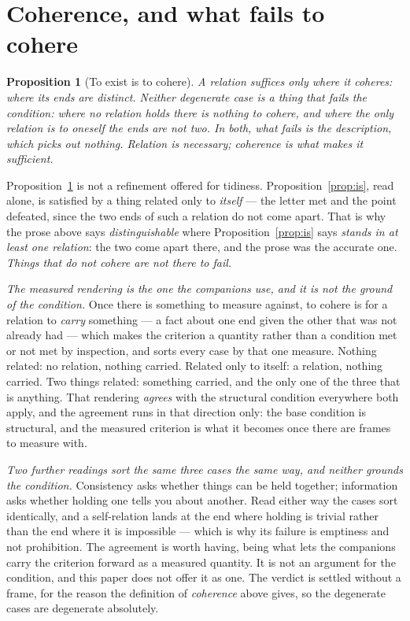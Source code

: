 \documentclass[11pt,a4paper]{article}
\newtheorem{proposition}{Proposition}
\theoremstyle{remark}\newtheorem{remark}[proposition]{Remark}
\begin{document}
\section{Coherence, and what fails to cohere}\label{sec:cohere}
\begin{proposition}[To exist is to cohere]\label{prop:cohere}
A relation suffices only where it \emph{coheres}: where its ends are distinct. Neither degenerate case
is a thing that fails the condition: where no relation holds there is nothing to cohere, and where the
only relation is to oneself the ends are not two. In both, what fails is the \emph{description}, which
picks out nothing. Relation is necessary; coherence is what makes it sufficient.
\end{proposition}

Proposition~\ref{prop:cohere} is not a refinement offered for tidiness.
Proposition~\ref{prop:is}, read alone, is satisfied by a thing related only to \emph{itself} --- the
letter met and the point defeated, since the two ends of such a relation do not come apart. That is why
the prose above says \emph{distinguishable} where Proposition~\ref{prop:is} says \emph{stands in at
least one relation}: the two come apart there, and the prose was the accurate one. \emph{Things that do
not cohere are not there to fail.}

\emph{The measured rendering is the one the companions use, and it is not the ground of the condition.}
Once there is something to measure against, to cohere is for a relation to \emph{carry} something --- a
fact about one end given the other that was not already had --- which makes the criterion a quantity
rather than a condition met or not met by inspection, and sorts every case by that one measure. Nothing
related: no relation, nothing carried. Related only to itself: a relation, nothing carried. Two things
related: something carried, and the only one of the three that is anything. That rendering
\emph{agrees} with the structural condition everywhere both apply, and the agreement runs in that
direction only: the base condition is structural, and the measured criterion is what it becomes once
there are frames to measure with.

\emph{Two further readings sort the same three cases the same way, and neither grounds the
condition.} Consistency asks whether things can be held together; information asks whether holding one
tells you about another. Read either way the cases sort identically, and a self-relation lands at the
end where holding is trivial rather than the end where it is impossible --- which is why its failure is
emptiness and not prohibition. The agreement is worth having, being what lets the companions carry the
criterion forward as a measured quantity. It is not an argument for the condition, and this paper does
not offer it as one. The verdict is settled without a frame, for the reason the definition of
\emph{coherence} above gives, so the degenerate cases are degenerate absolutely.
\end{document}
